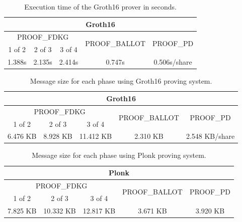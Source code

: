 \documentclass{article}
\begin{document}
\begin{table}
\centering
\label{table:groth16-time}
\caption{Execution time of the Groth16 prover in seconds.}
\begin{tabular}{|c|c|c|c|c|}
    \hline
    \multicolumn{5}{|c|}{Groth16} \\
    \hline
    \multicolumn{3}{|c|}{\textrm{PROOF}_\textrm{FDKG}} & \multirow{2}{*}{\textrm{PROOF}_\textrm{BALLOT}} & \multirow{2}{*}{\textrm{PROOF}_\textrm{PD}} \\
    \cline{1-3}
    1 of 2 & 2 of 3 & 3 of 4 & & \\
    \hline
    1.388s & 2.135s & 2.414s & 0.747s & 0.506s/share\\
    \hline
\end{tabular}
\end{table}

\begin{table}
\centering
\label{table:groth16-size}
\caption{Message size for each phase using Groth16 proving system.}
\begin{tabular}{|c|c|c|c|c|}
    \hline
    \multicolumn{5}{|c|}{Groth16} \\
    \hline
    \multicolumn{3}{|c|}{\textrm{PROOF}_\textrm{FDKG}} & \multirow{2}{*}{\textrm{PROOF}_\textrm{BALLOT}} & \multirow{2}{*}{\textrm{PROOF}_\textrm{PD}} \\
    \cline{1-3}
    1 of 2 & 2 of 3 & 3 of 4 & & \\
    \hline
    6.476 KB& 8.928 KB & 11.412 KB & 2.310 KB & 2.548 KB/share\\
    \hline
\end{tabular}
\end{table}

\begin{table}
\centering
\label{table:plonk-size}
\caption{Message size for each phase using Plonk proving system.}
\begin{tabular}{|c|c|c|c|c|}
    \hline
    \multicolumn{5}{|c|}{Plonk} \\
    \hline
    \multicolumn{3}{|c|}{\textrm{PROOF}_\textrm{FDKG}} & \multirow{2}{*}{\textrm{PROOF}_\textrm{BALLOT}} & \multirow{2}{*}{\textrm{PROOF}_\textrm{PD}} \\
    \cline{1-3}
    1 of 2 & 2 of 3 & 3 of 4 & & \\
    \hline
    7.825 KB& 10.332 KB & 12.817 KB & 3.671 KB & 3.920 KB\\
    \hline
\end{tabular}
\end{table}
\end{document}
